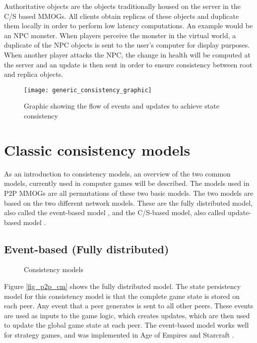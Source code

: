 Authoritative objects are the objects traditionally housed on the server in the C/S based MMOGs. All clients obtain replicas of these objects and duplicate them locally in order to perform low latency computations. An example would be an NPC monster. When players perceive the monster in the virtual world, a duplicate of the NPC objects is sent to the user's computer for display purposes. When another player attacks the NPC, the change in health will be computed at the server and an update is then sent in order to ensure consistency between root and replica objects.

\begin{figure}[htbp]
 \centering
 \texttt{[image: generic\_consistency\_graphic]}
 \caption{Graphic showing the flow of events and updates to achieve state consistency}
 \label{fig_event_update_flow_graphic}
\end{figure}



\section{Classic consistency models}
\label{classic_models}

As an introduction to consistency models, an overview of the two common models, currently used in computer games will be described. The models used
in P2P MMOGs are all permutations of these two basic models. The two models are based on the two different network models. These are the fully
distributed model, also called the event-based model \cite{p2p_cm_aoe}, and the C/S-based model, also called update-based model
\cite{unreal_networking}.

\subsection{Event-based (Fully distributed)} \label{classic_cs_event_based}

\begin{figure}[htbp]
\centering {}
\caption{Consistency models}
\end{figure}
%
Figure \ref{fig_p2p_cm} shows the fully distributed model. The state persistency model for this consistency model is that the complete game state is
stored on each peer. Any event that a peer generates is sent to all other peers. These events are used as inputs to the game logic, which creates
updates, which are then used to update the global game state at each peer. The event-based model works well for strategy games, and was implemented
in Age of Empires \cite{p2p_cm_aoe} and Starcraft \cite{starcraft_network_model}.

